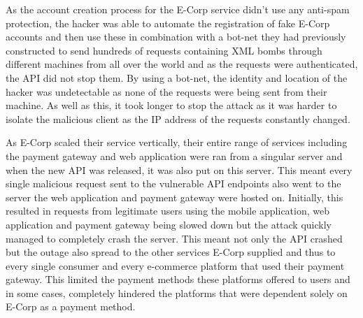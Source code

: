 \documentclass[]{report}
\begin{document}
As the account creation process for the E-Corp service didn't use any anti-spam protection, the hacker was able to automate the registration of fake E-Corp accounts and then use these in combination with a bot-net they had previously constructed to send hundreds of requests containing XML bombs through different machines from all over the world and as the requests were authenticated, the API did not stop them. By using a bot-net, the identity and location of the hacker was undetectable as none of the requests were being sent from their machine. As well as this, it took longer to stop the attack as it was harder to isolate the malicious client as the IP address of the requests constantly changed. 

As E-Corp scaled their service vertically, their entire range of services including the payment gateway and web application were ran from a singular server and when the new API was released, it was also put on this server. This meant every single malicious request sent to the vulnerable API endpoints also went to the server the web application and payment gateway were hosted on. Initially, this resulted in requests from legitimate users using the mobile application, web application and payment gateway being slowed down but the attack quickly managed to completely crash the server. This meant not only the API crashed but the outage also spread to the other services E-Corp supplied and thus to every single consumer and every e-commerce platform that used their payment gateway. This limited the payment methods these platforms offered to users and in some cases, completely hindered the platforms that were dependent solely on E-Corp as a payment method.
	
\end{document}
